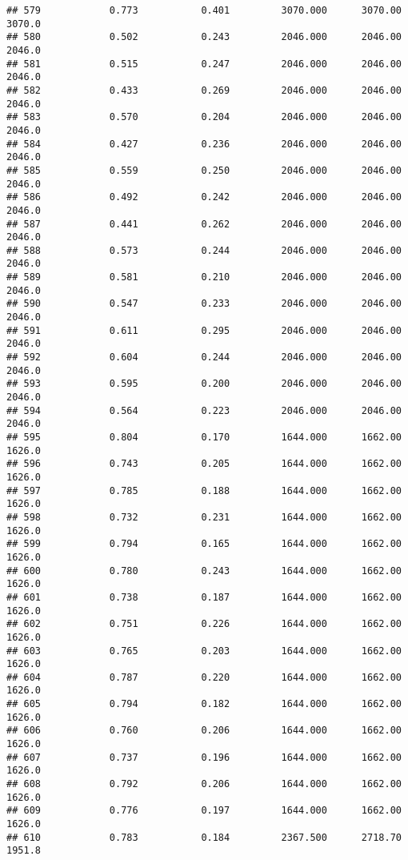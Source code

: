 \documentclass[
]{article}
\begin{document}
\begin{verbatim}
## 579            0.773           0.401         3070.000      3070.00       3070.0
## 580            0.502           0.243         2046.000      2046.00       2046.0
## 581            0.515           0.247         2046.000      2046.00       2046.0
## 582            0.433           0.269         2046.000      2046.00       2046.0
## 583            0.570           0.204         2046.000      2046.00       2046.0
## 584            0.427           0.236         2046.000      2046.00       2046.0
## 585            0.559           0.250         2046.000      2046.00       2046.0
## 586            0.492           0.242         2046.000      2046.00       2046.0
## 587            0.441           0.262         2046.000      2046.00       2046.0
## 588            0.573           0.244         2046.000      2046.00       2046.0
## 589            0.581           0.210         2046.000      2046.00       2046.0
## 590            0.547           0.233         2046.000      2046.00       2046.0
## 591            0.611           0.295         2046.000      2046.00       2046.0
## 592            0.604           0.244         2046.000      2046.00       2046.0
## 593            0.595           0.200         2046.000      2046.00       2046.0
## 594            0.564           0.223         2046.000      2046.00       2046.0
## 595            0.804           0.170         1644.000      1662.00       1626.0
## 596            0.743           0.205         1644.000      1662.00       1626.0
## 597            0.785           0.188         1644.000      1662.00       1626.0
## 598            0.732           0.231         1644.000      1662.00       1626.0
## 599            0.794           0.165         1644.000      1662.00       1626.0
## 600            0.780           0.243         1644.000      1662.00       1626.0
## 601            0.738           0.187         1644.000      1662.00       1626.0
## 602            0.751           0.226         1644.000      1662.00       1626.0
## 603            0.765           0.203         1644.000      1662.00       1626.0
## 604            0.787           0.220         1644.000      1662.00       1626.0
## 605            0.794           0.182         1644.000      1662.00       1626.0
## 606            0.760           0.206         1644.000      1662.00       1626.0
## 607            0.737           0.196         1644.000      1662.00       1626.0
## 608            0.792           0.206         1644.000      1662.00       1626.0
## 609            0.776           0.197         1644.000      1662.00       1626.0
## 610            0.783           0.184         2367.500      2718.70       1951.8

\end{verbatim}
\end{document}
